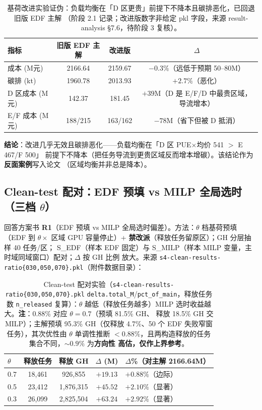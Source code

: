 \documentclass{internal-report}
\begin{document}
\begin{table}[H]
\centering
\footnotesize
\begin{tabular}{lccc}
\toprule
指标 & 旧版 EDF 主解 & 改进版 & $\Delta$ \\
\midrule
成本 (M元) & 2166.64 & 2159.67 & $-0.3\%$（远低于预期 50--80M） \\
碳排 (kt) & 1960.78 & 2013.93 & $+2.7\%$（恶化） \\
D 区成本 (M元) & 142.37 & 181.45 & $+39$M（D 是 E/F/D 中最贵区域，导流增本） \\
E/F 成本 (M元) & 188/215 & 163/162 & $-78$M（省下但被 D 抵消） \\
\bottomrule
\end{tabular}
\caption{基荷改进实验证伪：负载均衡在「D 区更贵」前提下不降本且碳排恶化，已回退旧版 EDF 主解
（阶段 2.1 记录；改进版数字非给定 pkl 字段，来源 result-analysis §7.6，待阶段 3 复核）。}
\label{tab:bal}
\end{table}

\textbf{结论}：改进几乎无效且碳排恶化——负载均衡在「D 区 PUE$\times$均价 541 $>$ E 467/F 500」
前提下不降本（把任务导流到更贵区域反而增本增碳）。该结论作为\textbf{反面案例}写入论文
（区域均衡并非总是降本）。

\subsection{Clean-test 配对：EDF 预填 vs MILP 全局选时（三档 $\theta$）}
\label{sec:clean}

回答方案书 \textbf{R1}（EDF 预填 vs MILP 全局选时偏差）。方法：$\theta$ 档基荷预填（EDF 到
$\theta\times$ 区域 GPU 容量停止）+ \textbf{禁改派}（释放任务留原区）；GH 分层抽样 40 任务/区；
S\_EDF（样本 EDF 固定）与 S\_MILP（样本 MILP 变量，主时域同域窗口）配对；$\Delta$ 按 GH 比例
放大。来源 \texttt{s4-clean-results-ratio\{030,050,070\}.pkl}（附件数据目录）：

\begin{table}[H]
\centering
\footnotesize
\begin{tabular}{lcccl}
\toprule
$\theta$ & 释放任务 & 释放 GH & $\Delta$ (M) & $\Delta$\%（对主解 2166.64M） \\
\midrule
0.7 & 18,461 & 926,855 & $+19.13$ & $+0.88\%$（边际） \\
0.5 & 23,412 & 1,876,315 & $+45.52$ & $+2.10\%$（显著） \\
0.3 & 26,099 & 2,825,504 & $+63.24$ & $+2.92\%$（显著） \\
\bottomrule
\end{tabular}
\caption{Clean-test 配对实验（\texttt{s4-clean-results-ratio\{030,050,070\}.pkl}
\texttt{delta.total\_M}/\texttt{pct\_of\_main}，释放任务数 \texttt{n\_released} 复算）：$\theta$
越低（释放任务越多）MILP 选时收益越大。\textbf{注}：0.88\% 对应 $\theta{=}0.7$（预填 81.5\% GH、
释放 18.5\% GH 交 MILP）；主解预填 95.3\% GH（仅释放 4.7\%、50 个 EDF 失败窄窗任务），其次优性由
$\theta$ 单调性推断 \textbf{$<0.88\%$}，且两构造释放的任务集合不同，$\sim 0.9\%$ 为\textbf{方向性
高估，仅作上界参考}。}
\label{tab:clean}
\end{table}
\end{document}
